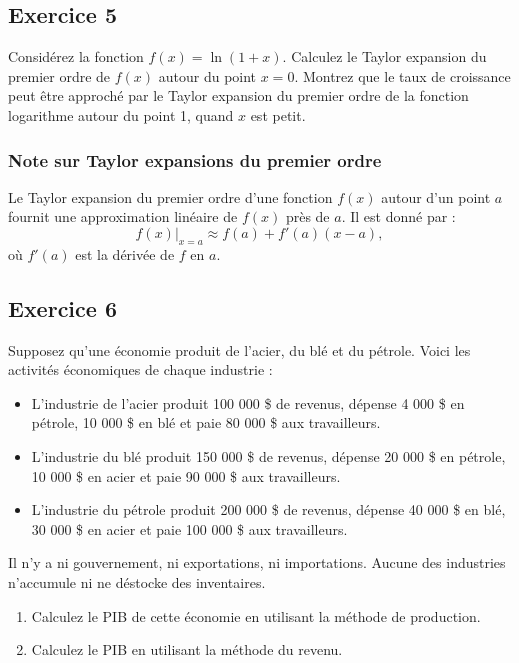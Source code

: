 \documentclass[11pt]{article}
\begin{document}
\subsection*{Exercice 5}
Considérez la fonction \( f(x) = \ln(1+x) \). 
Calculez le Taylor expansion du premier ordre de \( f(x) \) autour du point \( x = 0 \).
Montrez que le taux de croissance peut être approché par le  Taylor expansion du premier 
ordre de la fonction logarithme autour du point 1, quand \( x \) est petit.

\subsubsection*{Note sur Taylor expansions du premier ordre}
Le Taylor expansion du premier ordre d'une fonction \( f(x) \) autour d'un point \( a \) fournit une approximation linéaire de \( f(x) \) près de \( a \). 
Il est donné par :
\[
f(x) \big|_{x=a} \approx f(a) + f'(a)(x - a),
\]
où \( f'(a) \) est la dérivée de \( f \) en \( a \).

\subsection*{Exercice 6}
Supposez qu'une économie produit de l'acier, du blé et du pétrole. Voici les activités économiques de chaque industrie :
\begin{itemize}
    \item L'industrie de l'acier produit 100 000 \$ de revenus, dépense 4 000 \$ en pétrole, 10 000 \$ en blé et paie 80 000 \$ aux travailleurs.
    \item L'industrie du blé produit 150 000 \$ de revenus, dépense 20 000 \$ en pétrole, 10 000 \$ en acier et paie 90 000 \$ aux travailleurs.
    \item L'industrie du pétrole produit 200 000 \$ de revenus, dépense 40 000 \$ en blé, 30 000 \$ en acier et paie 100 000 \$ aux travailleurs.
\end{itemize}
Il n'y a ni gouvernement, ni exportations, ni importations. Aucune des industries n'accumule ni ne déstocke des inventaires.
\begin{enumerate}
    \item Calculez le PIB de cette économie en utilisant la méthode de production.
    \item Calculez le PIB en utilisant la méthode du revenu.
\end{enumerate}
\end{document}
